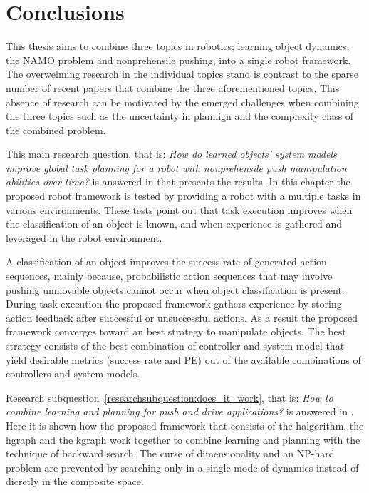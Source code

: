 \chapter{Conclusions}%
\label{chap:conclusion}
This thesis aims to combine three topics in robotics; learning object dynamics, the \ac{NAMO} problem and nonprehensile pushing, into a single robot framework. The overwelming research in the individual topics stand is contrast to the sparse number of recent papers that combine the three aforementioned topics. This absence of research can be motivated by the emerged challenges when combining the three topics such as the uncertainty in plannign and the complexity class of the combined problem.\bs


This main research question, that is: \textit{How do learned objects' system models improve global task planning for a robot with nonprehensile push manipulation abilities over time?} is answered in  that presents the results. In this chapter the proposed robot framework is tested by providing a robot with a multiple tasks in various environments. These tests point out that task execution improves when the classification of an object is known, and when experience is gathered and leveraged in the robot environment. 

A classification of an object improves the success rate of generated action sequences, mainly because, probabilistic action sequences that may involve pushing unmovable objects cannot occur when object classification is present. During task execution the proposed framework gathers experience by storing action feedback after successful or unsuccessful actions. As a result the proposed framework converges toward an best strategy to manipulate objects. The best strategy consists of the best combination of controller and system model that yield desirable metrics (success rate and \acl{PE}) out of the available combinations of controllers and system models. 

Research subquestion~\ref{researchsubquestion:does_it_work}, that is: \textit{How to combine learning and planning for push and drive applications?} is answered in . Here it is shown how the proposed framework that consists of the \acl{halgorithm}, the \acl{hgraph} and the \acl{kgraph} work together to combine learning and planning with the technique of backward search. The curse of dimensionality and an \ac{NP-hard} problem are prevented by searching only in a single mode of dynamics instead of dicretly in the composite space.

